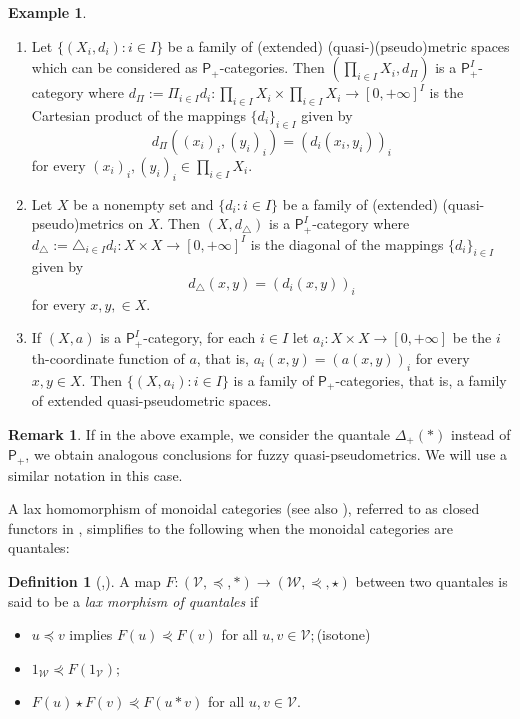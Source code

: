\documentclass[11pt,a4paper]{amsart}
\theoremstyle{definition}
\newtheorem{definition}[theorem]{Definition}
\newtheorem{example}[theorem]{Example}
\newtheorem{remark}[theorem]{Remark}
\begin{document}
	
	\begin{example}\label{ex:prodqpd}\
		\begin{enumerate}[(1)]
			\item Let $\Big\{(X_i,d_i):i\in I\Big\}$ be a family of (extended) (quasi-)(pseudo)metric spaces which can be considered as $\mathsf{P}_+$-categories. Then $(\prod_{i\in I} X_i,d_\Pi)$ is a $\mathsf{P}_+^I$-category where $d_\Pi:=\Pi_{i\in I} d_i:\prod_{i\in I} X_i\times \prod_{i\in I} X_i\to [0,+\infty]^I$ is the Cartesian product of the mappings $\{d_i\}_{i\in I}$ given by $$d_\Pi((x_i)_i,(y_i)_i)=(d_i(x_i,y_i))_i$$ for every $(x_i)_i,(y_i)_i\in \prod_{i\in I} X_i.$
			\item Let $X$ be a nonempty set and $\{d_i:i\in I\}$ be a family of (extended) (quasi-pseudo)metrics on $X.$ Then $(X,d_\triangle)$ is a $\mathsf{P}_+^I$-category where $d_\triangle:=\triangle_{i\in I} d_i:X\times X\to [0,+\infty]^I$ is the diagonal of the mappings $\{d_i\}_{i\in I}$ given by $$d_\triangle(x,y)=(d_i(x,y))_i$$ for every $x,y,\in X.$
			
			\item  If $(X,a)$ is a $\mathsf{P}_+^I$-category, for each $i\in I$ let $a_i:X\times X\to [0,+\infty]$ be the $i$th-coordinate function of $a$, that is, $a_i(x,y)=(a(x,y))_i$ for every $x,y\in X.$ Then $\Big\{(X,a_i):i\in I\Big\}$ is a family of $\mathsf{P}_+$-categories, that is, a family of extended quasi-pseudometric spaces.
			
		\end{enumerate}
	\end{example}
	
	\begin{remark}\label{rem:prodfqpd}
		If in the above example, we consider the quantale $\Delta_+(\ast)$ instead of $\mathsf{P}_+$, we obtain analogous conclusions for fuzzy quasi-pseudometrics. We will use a similar notation in this case.
	\end{remark}
	
	
	A lax homomorphism of monoidal categories \cite{BookMonoidalTopology} (see also \cite[p. 164]{McLane98}), referred to as closed functors in \cite[p. 149]{Lawv73},  simplifies to the following when the monoidal categories are quantales:
	
	\begin{definition}[\mbox{\cite[Section II.1.10]{BookMonoidalTopology},\cite{HofReis13}}]
		A map $F:(\mathscr{V},\preceq,\ast)\to(\mathscr{W},\curlyeqprec,\star)$ between two quantales is said to be a \emph{lax morphism of quantales} if
		\begin{itemize}
			\item $u\preceq v$ implies $F(u)\curlyeqprec F(v)$ for all $u,v\in\mathscr{V};$\hfill (isotone)
			\item $1_\mathscr{W}\curlyeqprec F(1_\mathscr{V});$
			\item $F(u)\star F(v)\curlyeqprec F(u\ast v)$ for all $u,v\in\mathscr{V}.$
		\end{itemize}
		
	\end{definition}
\end{document}
